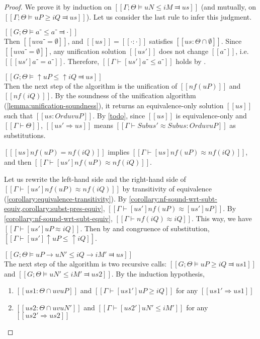 \begin{proof}
    We prove it by induction on $[[Γ ; Θ ⊨ uN ≤ iM ⫤ us]]$ (and mutually, on $[[Γ ; Θ ⊨ uP ≥ iQ ⫤ us]]$).
    Let us consider the last rule to infer this judgment. 
    \begin{caseof}
        \item $[[G;Θ ⊨ a⁻ ≤ a⁻ ⫤ ·]]$\\
        Then $[[uv a⁻ = ∅]]$, and $[[us]] = [[· : ·]]$ satisfies $[[us : Θ ∩ ∅]]$.
        Since $[[uv a⁻ = ∅]]$, any unification solution $[[us']]$ does not change $[[a⁻]]$, i.e.
        $[[ [us']a⁻ = a⁻ ]]$. Therefore, $[[Γ ⊢ [us']a⁻ ≤ a⁻]]$ holds by .

        \item $[[G;Θ ⊨ ↑uP ≤ ↑iQ ⫤ us]]$\\
        Then the next step of the algorithm is the unification of $[[nf(uP)]]$ and $[[nf(iQ)]]$.
        By the soundness of the unification algorithm (\cref{lemma:unification-soundness}),
        it returns an equivalence-only solution $[[us]]$ such that $[[us : Ord uv uP]]$.
        By \cref{todo}, since $[[us]]$ is equivalence-only and $[[Γ ⊢ Θ]]$, $[[us' ⇒ us]]$ means 
        $[[ Γ ⊢ Sub us' ≈ Sub us : Ord uv uP ]]$ as substitutions.

        $[[ [us]nf(uP) = nf(iQ) ]]$ implies $[[Γ ⊢ [us]nf(uP) ≈ nf(iQ)]]$, and then 
        $[[Γ ⊢ [us']nf(uP) ≈ nf(iQ)]]$. 

        Let us rewrite the left-hand side and the right-hand side of $[[Γ ⊢ [us']nf(uP) ≈ nf(iQ)]]$ by 
        transitivity of equivalence (\cref{corollary:equivalence-transitivity}).
        By \cref{corollary:nf-sound-wrt-subt-equiv,corollary:subst-pres-equiv},
        $[[Γ ⊢ [us']nf(uP) ≈ [us']uP ]]$. By \cref{corollary:nf-sound-wrt-subt-equiv}, 
        $[[Γ ⊢ nf(iQ) ≈ iQ ]]$. 
        This way, we have $[[Γ ⊢ [us']uP ≈ iQ]]$.
        Then by 
        and congruence of substitution, $[[Γ ⊢ [us']↑uP ≤ ↑iQ]]$.

        \item $[[G;Θ ⊨ uP → uN' ≤ iQ → iM' ⫤ us]]$\\
        The next step of the algorithm is two recursive calls:
        $[[G;Θ ⊨ uP ≥ iQ ⫤ us1]]$ and $[[G;Θ ⊨ uN' ≤ iM' ⫤ us2]]$.
        By the induction hypothesis, 
        \begin{enumerate}
            \item $[[us1 : Θ ∩ uv uP]]$ and $[[ Γ ⊢ [us1']uP ≥ iQ ]]$ for any $[[us1' ⇒ us1]]$
            \item $[[us2 : Θ ∩ uv uN']]$ and $[[ Γ ⊢ [us2']uN' ≤ iM' ]]$ for any $[[us2' ⇒ us2]]$
        \end{enumerate}


\end{caseof}
\end{proof}
